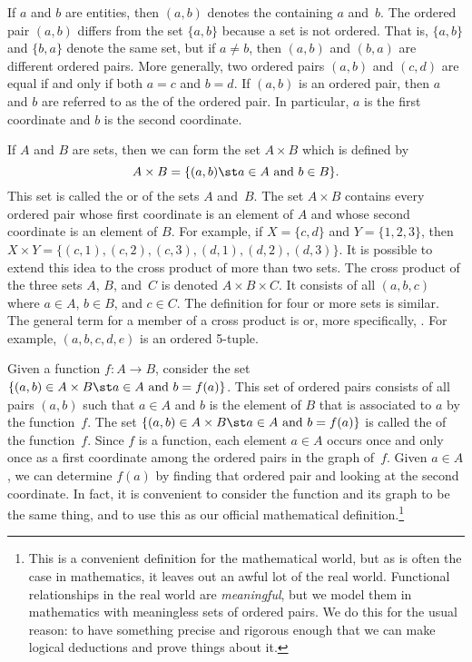 \medbreak

If $a$ and $b$ are entities, then $(a,b)$ denotes the
 containing $a$ and~$b$.  The ordered pair
$(a,b)$ differs from the set $\{a,b\}$ because a set is
not ordered.  That is, $\{a,b\}$ and $\{b,a\}$ denote the
same set, but if $a\not=b$, then $(a,b)$ and $(b,a)$ are
different ordered pairs.  More generally, two
ordered pairs $(a,b)$ and $(c,d)$ are equal if and only if
both $a=c$ and $b=d$.  If $(a,b)$ is an ordered pair,
then $a$ and $b$ are referred to as the  of the
ordered pair.  In particular, $a$ is the first coordinate and
$b$ is the second coordinate.

If $A$ and $B$ are sets, then we can form the set
$A\times B$ which is defined by \[A\times B=
\{(a,b)\st a\in A \text{ and } b\in B\}.\]
This set is called the  or
 of the sets $A$ and~$B$.
The set $A\times B$ contains every ordered pair whose first
coordinate is an element of $A$ and whose second coordinate is
an element of $B$.  For example, if $X=\{c,d\}$ and
$Y=\{1,2,3\}$, then $X\times Y=\{(c,1), (c,2), (c,3), (d,1),(d,2), (d,3)\}$.
It is possible to extend this idea to the cross product
of more than two sets.  The cross product of the three sets
$A$, $B$, and~$C$ is denoted $A\times B\times C$.  It consists
of all  $(a,b,c)$
where $a\in A$, $b\in B$, and $c\in C$.  The definition for
four or more sets is similar.  The general term for a member
of a cross product is  or, more specifically,
.  For example, $(a,b,c,d,e)$ is
an ordered 5-tuple.

Given a function $f\colon A\to B$, consider the
set $\{(a,b)\in A\times B\st a\in A \text{ and } b=f(a)\}$.  
This set of ordered pairs consists
of all pairs $(a,b)$ such that $a\in A$ and $b$ is the element of
$B$ that is associated to $a$ by the function~$f$.  The set
$\{(a,b)\in A\times B\st a\in A \text{ and } b=f(a)\}$ is called the
 of the function~$f$.  Since $f$ is a function,
each element $a\in A$ occurs once and only once as a first coordinate
among the ordered pairs in the graph of~$f$.  Given $a\in A$, we
can determine $f(a)$ by finding that ordered pair and looking
at the second coordinate.  In fact, it is convenient to consider
the function and its graph to be the same thing, and to use
this as our official mathematical definition.\footnote{This is
a convenient definition for the mathematical world, but as is often
the case in mathematics, it leaves out an awful lot of the real
world.  Functional relationships in the real world are \emph{meaningful},
but we model them in mathematics with meaningless sets of ordered
pairs.  We do this for the usual reason: to have something precise
and rigorous enough that we can make logical deductions and prove
things about it.}

